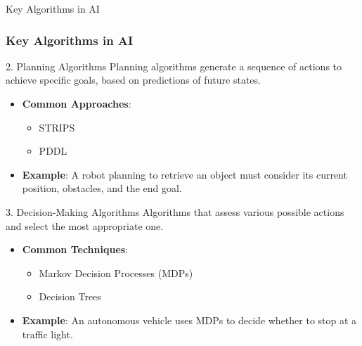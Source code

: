 \documentclass[aspectratio=169]{beamer}
\begin{document}
\begin{frame}[fragile]{Key Algorithms in AI}
    \frametitle{Key Algorithms in AI}
    
    \begin{block}{2. Planning Algorithms}
        Planning algorithms generate a sequence of actions to achieve specific goals, based on predictions of future states.
        \begin{itemize}
            \item \textbf{Common Approaches}:
                \begin{itemize}
                    \item STRIPS
                    \item PDDL
                \end{itemize}
            \item \textbf{Example}:
                A robot planning to retrieve an object must consider its current position, obstacles, and the end goal.
        \end{itemize}
    \end{block}

    \begin{block}{3. Decision-Making Algorithms}
        Algorithms that assess various possible actions and select the most appropriate one.
        \begin{itemize}
            \item \textbf{Common Techniques}:
                \begin{itemize}
                    \item Markov Decision Processes (MDPs)
                    \item Decision Trees
                \end{itemize}
            \item \textbf{Example}:
                An autonomous vehicle uses MDPs to decide whether to stop at a traffic light.
        \end{itemize}
    \end{block}
\end{frame}
\end{document}
